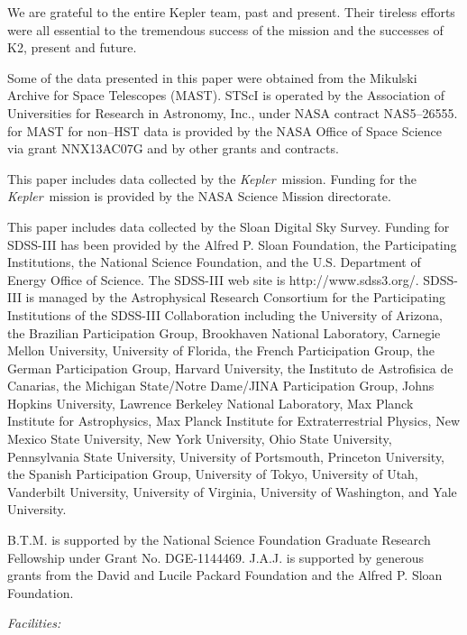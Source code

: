 \documentclass{emulateapj}
\newcommand{\project}[1]{\textsl{#1}}
\newcommand{\kep}{\project{Kepler}}
\newcommand{\todo}[3]{{\color{#2} \emph{#1} TO DO: #3}}
\newcommand{\btmtodo}[1]{\todo{BEN}{red}{#1}}
\begin{document}
We are grateful to the entire Kepler team, past and present. 
Their tireless efforts were all essential to the tremendous success of the mission and the successes of K2, present and future.


Some of the data presented in this paper were obtained from the Mikulski
Archive for Space Telescopes (MAST). 
STScI is operated by the Association of Universities for Research 
in Astronomy, Inc., under NASA contract NAS5--26555. 
for MAST for non--HST data is provided by the NASA Office of Space 
Science via grant NNX13AC07G and by other grants and contracts. 

This paper includes data collected by the \kep\ mission. 
Funding for the \kep\ mission is provided by the NASA Science 
Mission directorate.

This paper includes data collected by the Sloan Digital Sky Survey.
Funding for SDSS-III has been provided by the Alfred P. Sloan Foundation,
the Participating Institutions, the National Science Foundation, and the
U.S. Department of Energy Office of Science. The SDSS-III web site is
http://www.sdss3.org/.
SDSS-III is managed by the Astrophysical Research Consortium for the
Participating Institutions of the SDSS-III Collaboration including the
University of Arizona, the Brazilian Participation Group, Brookhaven
National Laboratory, Carnegie Mellon University, University of Florida,
the French Participation Group, the German Participation Group, Harvard
University, the Instituto de Astrofisica de Canarias, the Michigan
State/Notre Dame/JINA Participation Group, Johns Hopkins University,
Lawrence Berkeley National Laboratory, Max Planck Institute for
Astrophysics, Max Planck Institute for Extraterrestrial Physics, New
Mexico State University, New York University, Ohio State University,
Pennsylvania State University, University of Portsmouth, Princeton
University, the Spanish Participation Group, University of Tokyo,
University of Utah, Vanderbilt University, University of Virginia,
University of Washington, and Yale University.

B.T.M. is supported by the National Science Foundation Graduate Research
Fellowship under Grant No. DGE‐1144469. 
J.A.J. is supported by generous grants from the David and Lucile Packard
Foundation and the Alfred P. Sloan Foundation.



{\it Facilities:} %




\end{document}
